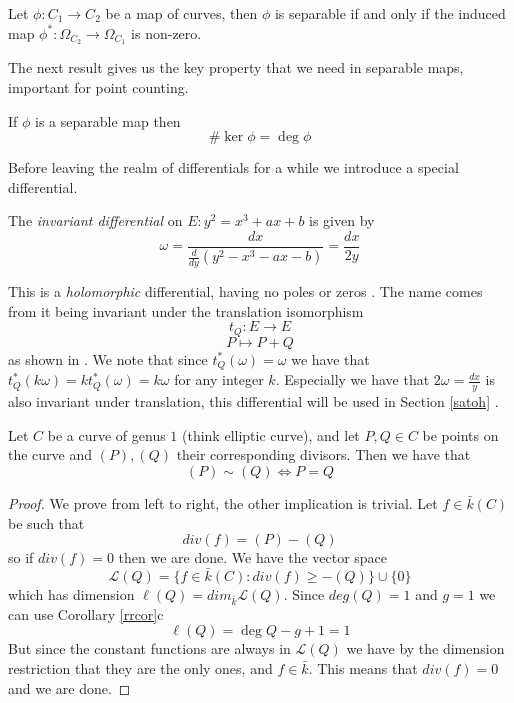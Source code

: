 \begin{prop} \label{diffsep}
 Let $\phi: C_1 \rightarrow C_2$ be a map of curves, then $\phi$ is separable if and only if
the induced map $\phi^*: \Omega_{C_2} \rightarrow \Omega_{C_1} $ is non-zero.
\end{prop}

The next result gives us the key property that we need in separable maps, important for
point counting.
\begin{thm} \label{kerdeg}
 If $\phi$ is a separable map then
$$\#\ker \phi = \deg \phi$$
\end{thm}

Before leaving the realm of differentials for a while we introduce a special differential.
\begin{mydef}
The \emph{invariant differential} on $E: y^2 = x^3 + ax + b$ is given by
$$\omega = \frac{dx}{\frac{d}{dy}\left(y^2 - x^3  - ax - b\right)} = \frac{dx}{2y} $$
\end{mydef}
This is a \emph{holomorphic} differential, having no poles or zeros \cite{AEC}. The name comes from it
being invariant under the translation isomorphism
$$ t_Q: E \rightarrow E$$
$$ P \mapsto P + Q$$
as shown in \cite{AEC}. We note that since $t_Q^*(\omega) = \omega$ we have that
$t_Q^*(k\omega) = k t_Q^*(\omega) = k\omega$ for any integer $k$. Especially we have that
$2\omega = \frac{dx}{y}$ is also invariant under translation, this differential will be used
in Section \ref{satoh} \label{invariant}.

\begin{prop} \label{3.3}
 Let $C$ be a curve of genus $1$ (think elliptic curve), and let $P,Q\in C$ be points on the curve and
$(P), (Q)$ their corresponding divisors. Then we have that
$$ (P) \sim (Q) \iff P = Q $$
\end{prop}
\begin{proof}
 We prove from left to right, the other implication is trivial. Let $f\in \bar{k}(C)$ be such that
$$ div(f) = (P)-(Q) $$
so if $div(f) = 0$ then we are done. We have the vector space
$$ \mathscr{L}(Q) = \{ f\in \bar{k}(C) : div(f) \geq -(Q) \} \cup \{ 0 \} $$
which has dimension $\ell(Q) = dim_{\bar{k}} \mathscr{L}(Q)$. Since $deg(Q) = 1$ and $g = 1$
we can use Corollary \ref{rrcor}c 
$$\ell(Q) = \deg Q - g + 1 = 1$$
But since the constant functions are always in $\mathscr{L}(Q)$ we have by the dimension restriction that
they are the only ones, and $f \in \bar{k}$. This means that $div(f) = 0$ and we are done.
\end{proof}

